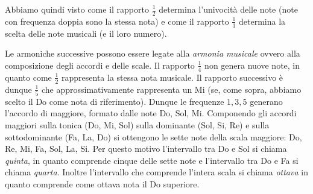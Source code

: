 Abbiamo quindi visto come il rapporto $\frac 1 2$ determina l'univocità delle note 
(note con frequenza doppia sono la stessa nota) e come il rapporto $\frac 1 3$ 
determina la scelta delle note musicali (e il loro numero).

Le armoniche successive possono essere legate alla \emph{armonia musicale} ovvero 
alla composizione degli accordi e delle scale. 
Il rapporto $\frac 1 4$ non genera nuove note, in quanto come $\frac 1 2$ rappresenta 
la stessa nota musicale. Il rapporto successivo è dunque $\frac 1 5$ che approssimativamente 
rappresenta un Mi (se, come sopra, abbiamo scelto il Do come nota di riferimento).
Dunque le frequenze $1,3,5$ generano l'accordo di maggiore, formato dalle 
note Do, Sol, Mi. 
Componendo gli accordi maggiori sulla tonica (Do, Mi, Sol) 
sulla dominante (Sol, Si, Re) e sulla sottodominante (Fa, La, Do) si ottengono
le sette note della scala maggiore: Do, Re, Mi, Fa, Sol, La, Si.
Per questo motivo l'intervallo tra Do e Sol si chiama \emph{quinta}, in quanto comprende 
cinque delle sette note e l'intervallo tra Do e Fa si chiama \emph{quarta}.
Inoltre l'intervallo che comprende l'intera scala si chiama \emph{ottava} in quanto 
comprende come ottava nota il Do superiore.

%






